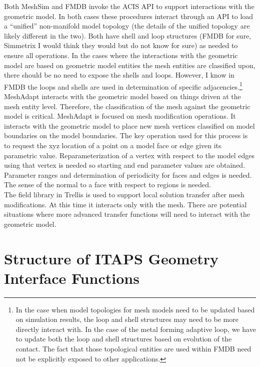 \documentclass{article}
\begin{document}
Both MeshSim and FMDB invoke the ACIS API to support interactions 
with the geometric model. In both cases these procedures interact 
through an API to load a ``unified'' non-manifold model topology 
(the details of the unified topology are likely different in 
the two). Both have shell and loop structures (FMDB for sure, 
Simmetrix I would think they would but do not know for sure) 
as needed to ensure all operations. In the cases where the interactions 
with the geometric model are based on geometric model entities 
the mesh entities are classified upon, there should be no need 
to expose the shells and loops. However, I know in FMDB the loops 
and shells are used in determination of specific adjacencies.\footnote{In 
the case when model topologies for mesh models need to be updated 
based on simulation results, the loop and shell structures may 
need to be more directly interact with. In the case of the metal 
forming adaptive loop, we have to update both the loop and shell 
structures based on evolution of the contact. The fact that 
those topological entities are used within FMDB need not be explicitly 
exposed to other applications.}\\


MeshAdapt interacts with the geometric model based on things 
driven at the mesh entity level. Therefore, the classification 
of the mesh against the geometric model is critical. MeshAdapt 
is focused on mesh modification operations. It interacts with 
the geometric model to place new mesh vertices classified on 
model boundaries on the model boundaries. The key operation used 
for this process is to request the xyz location of a point on 
a model face or edge given its parametric value. Reparameterization 
of a vertex with respect to the model edges using that vertex 
is needed so starting and end parameter values are obtained. 
Parameter ranges and determination of periodicity for faces and 
edges is needed. The sense of the normal to a face with respect 
to regions is needed. \\


The field library in Trellis is used to support local solution 
transfer after mesh modifications. At this time it interacts 
only with the mesh. There are potential situations where more 
advanced transfer functions will need to interact with the geometric 
model.

\section{Structure of ITAPS Geometry Interface Functions}
\end{document}
